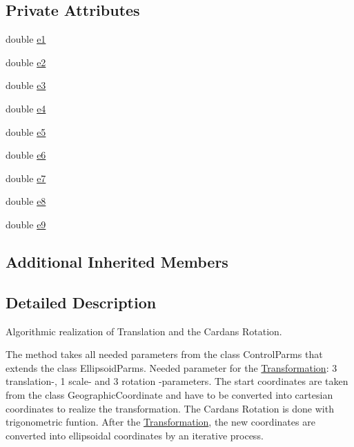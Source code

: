 \subsection*{Private Attributes}
\begin{DoxyCompactItemize}
\item 
double \hyperlink{classdatumstrategy_1_1_cardans_transformation_a046bfbee5b4f44c7a610dda57535fd48}{e1}
\item 
double \hyperlink{classdatumstrategy_1_1_cardans_transformation_a432075c182e72c4513c507e68207270e}{e2}
\item 
double \hyperlink{classdatumstrategy_1_1_cardans_transformation_a07926f1115857a14d2ccd9ac05ddb17b}{e3}
\item 
double \hyperlink{classdatumstrategy_1_1_cardans_transformation_a50920df59cf915ff50950f21e974551b}{e4}
\item 
double \hyperlink{classdatumstrategy_1_1_cardans_transformation_a99129fc5d3eeef62bdaa85d944d1fe90}{e5}
\item 
double \hyperlink{classdatumstrategy_1_1_cardans_transformation_a7d122d0c257e3f729d0ee4899c00fa83}{e6}
\item 
double \hyperlink{classdatumstrategy_1_1_cardans_transformation_ac04153c0bcafda4b5fec06aae13af1fa}{e7}
\item 
double \hyperlink{classdatumstrategy_1_1_cardans_transformation_a53aec6feed61d2e32caeb429c832ab6b}{e8}
\item 
double \hyperlink{classdatumstrategy_1_1_cardans_transformation_ace8c836c980cd25298796b2cde125c6b}{e9}
\end{DoxyCompactItemize}
\subsection*{Additional Inherited Members}


\subsection{Detailed Description}
Algorithmic realization of Translation and the Cardan\textquotesingle{}s Rotation. 

The method takes all needed parameters from the class Control\+Parms that extends the class Ellipsoid\+Parms. Needed parameter for the \hyperlink{class_transformation}{Transformation}\+: 3 translation-\/, 1 scale-\/ and 3 rotation -\/parameters. The start coordinates are taken from the class Geographic\+Coordinate and have to be converted into cartesian coordinates to realize the transformation. The Cardan\textquotesingle{}s Rotation is done with trigonometric funtion. After the \hyperlink{class_transformation}{Transformation}, the new coordinates are converted into ellipsoidal coordinates by an iterative process.

